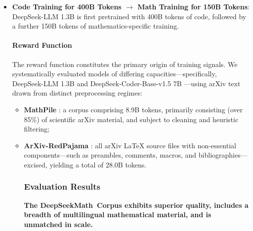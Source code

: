 \begin{itemize}[topsep=0pt]
    \item \textbf{Code Training for 400B Tokens $\rightarrow$ Math Training for 150B Tokens}: DeepSeek-LLM 1.3B is first pretrained with 400B tokens of code, followed by a further 150B tokens of mathematics-specific training. \paragraph{Reward Function} The reward function constitutes the primary origin of training signals. We systematically evaluated models of differing capacities—specifically, DeepSeek-LLM 1.3B and DeepSeek-Coder-Base-v1.5 7B \citep{deepseek-coder}—using arXiv text drawn from distinct preprocessing regimes:

\begin{itemize}[topsep=0pt]
    \item \textbf{MathPile} \citep{mathpile}: a corpus comprising 8.9B tokens, primarily consisting (over 85\%) of scientific arXiv material, and subject to cleaning and heuristic filtering;
    \item \textbf{ArXiv-RedPajama} \citep{redpajama}: all arXiv LaTeX source files with non-essential components—such as preambles, comments, macros, and bibliographies—excised, yielding a total of 28.0B tokens. \subsubsection{Evaluation Results}

\textbf{The DeepSeekMath~Corpus exhibits superior quality, includes a breadth of multilingual mathematical material, and is unmatched in scale.}

\end{itemize}
\end{itemize}
